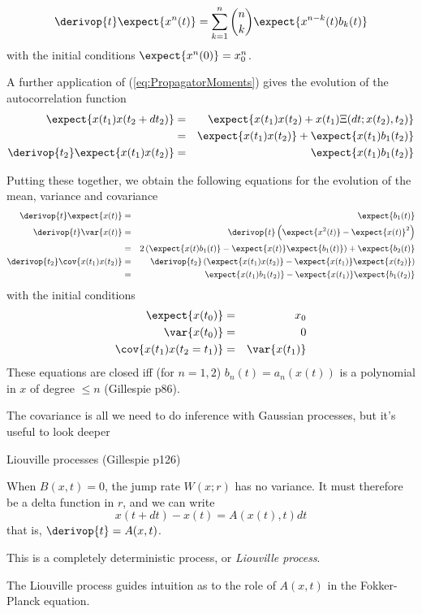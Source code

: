 \documentclass{beamer}
\begin{document}
\begin{frame}{}
\[
\derivop{t} \expect{x^n(t)} = \sum_{k=1}^n \binom{n}{k} \expect{x^{n-k}(t) b_k(t)}
\]
with the initial conditions $\expect{x^n(0)} = x_0^n$.
 \item A further application of (\ref{eq:PropagatorMoments}) gives the evolution of the autocorrelation function
\begin{eqnarray*}
\expect{x(t_1)x(t_2+dt_2)} & = & \expect{x(t_1)x(t_2) + x(t_1)\Xi(dt;x(t_2),t_2)} \\
& = & \expect{x(t_1)x(t_2)} + \expect{x(t_1)b_1(t_2)} \\
\derivop{t_2} \expect{x(t_1)x(t_2)} & = & \expect{x(t_1)b_1(t_2)}
\end{eqnarray*}
 \item Putting these together, we obtain the following equations for the evolution of the mean, variance and covariance
\begin{eqnarray*}
\derivop{t} \expect{x(t)} & = & \expect{b_1(t)} \\
\derivop{t} \var{x(t)} & = & \derivop{t} \left( \expect{x^2(t)} - \expect{x(t)}^2 \right) \\
& = & 2\left( \expect{x(t)b_1(t)} - \expect{x(t)}\expect{b_1(t)} \right) + \expect{b_2(t)} \\
\derivop{t_2} \cov{x(t_1)x(t_2)} & = & \derivop{t_2} \left( \expect{x(t_1)x(t_2)} - \expect{x(t_1)}\expect{x(t_2)} \right) \\
& = & \expect{x(t_1)b_1(t_2)} - \expect{x(t_1)}\expect{b_1(t_2)}
\end{eqnarray*}
with the initial conditions
\begin{eqnarray*}
\expect{x(t_0)} & = & x_0 \\
\var{x(t_0)} & = & 0 \\
\cov{x(t_1)x(t_2=t_1)} & = & \var{x(t_1)}
\end{eqnarray*}
These equations are closed iff (for $n=1,2$) $b_n(t)=a_n(x(t))$ is a polynomial in $x$ of degree $\leq n$ (Gillespie p86).
 \item The covariance is all we need to do inference with Gaussian processes, but it's useful to look deeper
 \iteme
\item Liouville processes (Gillespie p126)
 \itemb
 \item When $B(x,t)=0$, the jump rate $W(x;r)$ has no variance.
It must therefore be a delta function in $r$, and we can write
\[
x(t+dt) - x(t) = A(x(t),t) dt
\]
that is, $\derivop{t} = A(x,t)$.
 \item This is a completely deterministic process, or {\em Liouville process}.
 \item The Liouville process guides intuition as to the role of $A(x,t)$ in the Fokker-Planck equation.
 \iteme
\iteme

\end{frame}
\end{document}
